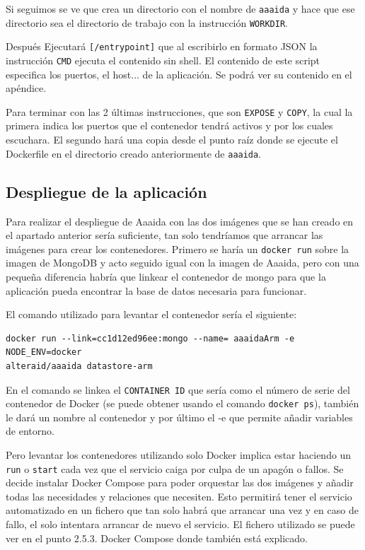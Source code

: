 Si seguimos se ve que crea un directorio con el nombre de \texttt{aaaida} y hace que ese directorio sea el directorio de trabajo con la instrucción \texttt{WORKDIR}.
 
Después Ejecutará \texttt{[/entrypoint]} que al escribirlo en formato JSON la instrucción \texttt{CMD} ejecuta el contenido sin shell. El contenido de este script especifica los puertos, el host... de la aplicación. Se podrá ver su contenido en el apéndice.
 
Para terminar con las 2 últimas instrucciones, que son \texttt{EXPOSE} y \texttt{COPY}, la cual la primera indica los puertos que el contenedor tendrá activos y por los cuales escuchara. El segundo hará una copia desde el punto raíz donde se ejecute el Dockerfile en el directorio creado anteriormente de \texttt{aaaida}.

\subsection{Despliegue de la aplicación} 

Para realizar el despliegue de Aaaida con las dos imágenes que se han creado en el apartado anterior sería suficiente, tan solo tendríamos que arrancar las imágenes para crear los contenedores. 
Primero se haría un \texttt{docker run} sobre la imagen de MongoDB y acto seguido igual con la imagen de Aaaida, pero con una pequeña diferencia habría que linkear el contenedor de mongo para que la aplicación pueda encontrar la base de datos necesaria para funcionar.
\pagebreak 

El comando utilizado para levantar el contenedor sería el siguiente:

\begin{center}
\begin{verbatim}
docker run --link=cc1d12ed96ee:mongo --name= aaaidaArm -e NODE_ENV=docker 
alteraid/aaaida datastore-arm
\end{verbatim}
\end{center}

En el comando se linkea el \texttt{CONTAINER ID} que sería como el número de serie del contenedor de Docker (se puede obtener usando el comando \texttt{docker ps}), también le dará un nombre al contenedor y por último el -e que permite añadir variables de entorno.
\newline 

Pero levantar los contenedores utilizando solo Docker implica estar haciendo un \texttt{run} o \texttt{start} cada vez que el servicio caiga por culpa de un apagón o fallos. Se decide instalar Docker Compose para poder orquestar las dos imágenes y añadir todas las necesidades y relaciones que necesiten. Esto permitirá tener el servicio automatizado en un fichero que tan solo habrá que arrancar una vez y en caso de fallo, el solo intentara arrancar de nuevo el servicio. El fichero utilizado se puede ver en el punto 2.5.3. Docker Compose donde también está explicado. 

